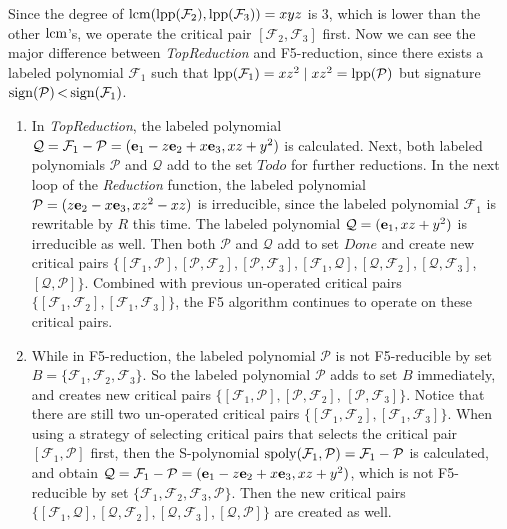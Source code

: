 \documentclass[preprint,authoryear,3p,12pt]{elsarticle}
\def\lpp{{\rm lpp}}
\def\eb{{\bf e}}
\def\lcm{{\rm lcm}}
\def\sp{{\rm spoly}}
\def\prs{{\,<\,}}
\def\s{{\rm{sign}}}
\begin{document}
Since the degree of $\lcm(\lpp({\mathcal F}_2), \lpp({\mathcal
F}_3))=xyz$ is $3$, which is lower than the other $\lcm$'s, we
operate the critical pair $[{\mathcal F}_2, {\mathcal F}_3]$ first.
Now we can see the major difference between {\em TopReduction} and
F5-reduction, since there exists a labeled polynomial ${\mathcal
F}_1$ such that $\lpp({\mathcal F}_1)=xz^2 \mid
xz^2=\lpp({\mathcal P})$ but signature $\s({\mathcal P}) \prs
\s({\mathcal F}_1)$.
\begin{enumerate}

\item[$\bullet$] In {\em TopReduction}, the labeled polynomial
${\mathcal Q} = {\mathcal F}_1 - {\mathcal P}=(\eb_1-z\eb_2+x\eb_3, xz+y^2)$ is calculated. Next, both labeled polynomials
${\mathcal P}$ and ${\mathcal Q}$ add to the set $Todo$ for further reductions. In the next loop of the {\em Reduction} function,
the labeled polynomial ${\mathcal P}=(z\eb_2-x\eb_3, xz^2-xz)$ is irreducible, since the labeled polynomial ${\mathcal F}_1$ is
rewritable by  $R$ this time. The labeled polynomial ${\mathcal Q} =(\eb_1, xz+y^2)$ is irreducible as well. Then both ${\mathcal
P}$ and ${\mathcal Q}$ add to set $Done$ and create new critical pairs $\{[{\mathcal F}_1, {\mathcal P}], [{\mathcal P},
{\mathcal F}_2], [{\mathcal P}, {\mathcal F}_3], [{\mathcal F}_1, {\mathcal Q}], [{\mathcal Q}, {\mathcal F}_2], [{\mathcal Q},
{\mathcal F}_3]$, $[{\mathcal Q}, {\mathcal P}]\}$. Combined with previous un-operated critical pairs $\{[{\mathcal F}_1,
{\mathcal F}_2], [{\mathcal F}_1, {\mathcal F}_3]\}$, the F5 algorithm continues to operate on these critical pairs.

\item[$\bullet$] While in F5-reduction, the labeled polynomial
${\mathcal P}$ is not F5-reducible by set $B=\{{\mathcal F}_1,
{\mathcal F}_2, {\mathcal F}_3\}$. So the labeled polynomial
${\mathcal P}$ adds to set $B$ immediately, and creates new critical
pairs $\{[{\mathcal F}_1, {\mathcal P}], [{\mathcal P}, {\mathcal
F}_2]$, $[{\mathcal P}, {\mathcal F}_3]\}$. Notice that there are
still two un-operated critical pairs $\{[{\mathcal F}_1, {\mathcal
F}_2], [{\mathcal F}_1, {\mathcal F}_3]\}$. When using a strategy of
selecting critical pairs that selects the critical pair $[{\mathcal
F}_1, {\mathcal P}]$ first, then the S-polynomial $\sp({\mathcal
F}_1, {\mathcal P})={\mathcal F}_1 - {\mathcal P}$ is calculated,
and obtain ${\mathcal Q} = {\mathcal F}_1 - {\mathcal
P}=(\eb_1-z\eb_2+x\eb_3, xz+y^2)$, which is not F5-reducible by set
$\{{\mathcal F}_1, {\mathcal F}_2, {\mathcal F}_3, {\mathcal P}\}$.
Then the new critical pairs $\{[{\mathcal F}_1, {\mathcal Q}],
[{\mathcal Q}, {\mathcal F}_2], [{\mathcal Q}, {\mathcal F}_3],
[{\mathcal Q}, {\mathcal P}]\}$ are created as well.
\end{enumerate}
\end{document}
